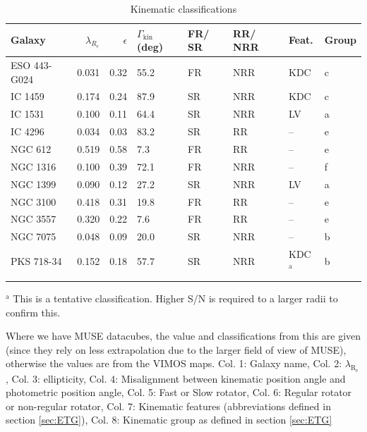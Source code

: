 		\begin{table}
		\begin{threeparttable}
			\centering
			\caption{Kinematic classifications}
			\label{tab:classify}
			\begin{tabular}{l r r p{0.7cm} l l l l}
				\hline
				\hline
				Galaxy		& $\lambda_{R_e}$ & $\epsilon$  & $\Gamma_\text{kin}$ (deg) & FR/ SR 	& RR/ NRR 	& Feat. & Group 	\\
				\hline 
				ESO 443-G024 & 0.031 & 0.32 & 55.2 	& FR & NRR & KDC & c \\
				IC 1459 	& 0.174 & 0.24 & 87.9	& SR & NRR & KDC & c \\
				IC 1531 	& 0.100 & 0.11 & 64.4 	& SR & NRR & LV & a \\
				IC 4296		& 0.034 & 0.03 & 83.2 	& SR & RR & -- & e \\
				NGC 612 	& 0.519 & 0.58 & \vphantom{0}7.3 	& FR & RR & -- & e \\
				NGC 1316 	& 0.100 & 0.39 & 72.1 	& FR & NRR & -- & f \\
				NGC 1399 	& 0.090 & 0.12 & 27.2 	& SR & NRR & LV & a \\
				NGC 3100 	& 0.418 & 0.31 & 19.8 	& FR & RR & -- & e \\
				NGC 3557 	& 0.320 & 0.22 & \vphantom{0}7.6 	& FR & RR & -- & e\\
				NGC 7075 	& 0.048 & 0.09 & 20.0 	& SR & NRR & -- & b \\
				PKS 718-34  & 0.152 & 0.18 & 57.7 	& SR & NRR & KDC$^\text{a}$ & b\\
				\hline
				\hline
				\multicolumn{7}{L{.9\textwidth}}{\footnotesize } \\ %
			\end{tabular}
			\begin{tablenotes}
			\small
			\item $^\text{a}$ This is a tentative classification. Higher S/N is required to a larger radii to confirm this.
			\item Where we have MUSE datacubes, the value and classifications from this are given (since they rely on less extrapolation due to the larger field of view of MUSE), otherwise the values are from the VIMOS maps. Col. 1: Galaxy name, Col. 2: $\lambda_\mathrm{R_e}$, Col. 3: ellipticity, Col. 4: Misalignment between kinematic position angle and photometric position angle, Col. 5: Fast or Slow rotator, Col. 6: Regular rotator or non-regular rotator, Col. 7: Kinematic features (abbreviations defined in section \ref{sec:ETG}), Col. 8: Kinematic group as defined in section \ref{sec:ETG}
			\end{tablenotes}
		\end{threeparttable}
		\end{table}

